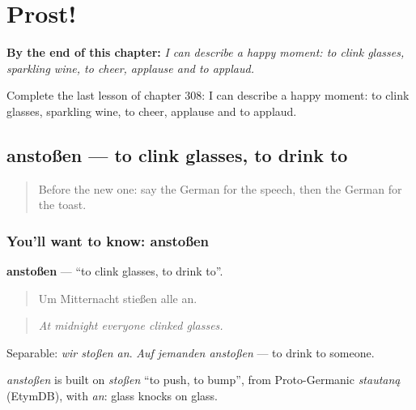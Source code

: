 
\chapter{Prost!}
\label{ch:ge-prost}

\begin{chapteropening}
\textbf{By the end of this chapter:} \emph{I can describe a happy moment: to clink glasses, sparkling wine, to cheer, applause and to applaud.}

Complete the last lesson of chapter 308: I can describe a happy moment: to clink glasses, sparkling wine, to cheer, applause and to applaud.
\end{chapteropening}

\section[anstoßen]{anstoßen — to clink glasses, to drink to}

\label{lesson:GE-C308-anstossen}



\begin{quote}
Before the new one: say the German for the speech, then the German for the toast.
\end{quote}

\subsection*{You'll want to know: anstoßen}
\textbf{anstoßen} — \textquotedblleft{}to clink glasses, to drink to\textquotedblright{}.

\begin{quote}
Um Mitternacht stießen alle an.
\end{quote}

\begin{quote}
\emph{At midnight everyone clinked glasses.}
\end{quote}

Separable: \emph{wir stoßen an}. \emph{Auf jemanden anstoßen} — to drink to someone.

\begin{cousinweb}
\emph{anstoßen} is built on \emph{stoßen} \textquotedblleft{}to push, to bump\textquotedblright{}, from Proto-Germanic \emph{stautaną} (EtymDB), with \emph{an}: glass knocks on glass.
\end{cousinweb}

